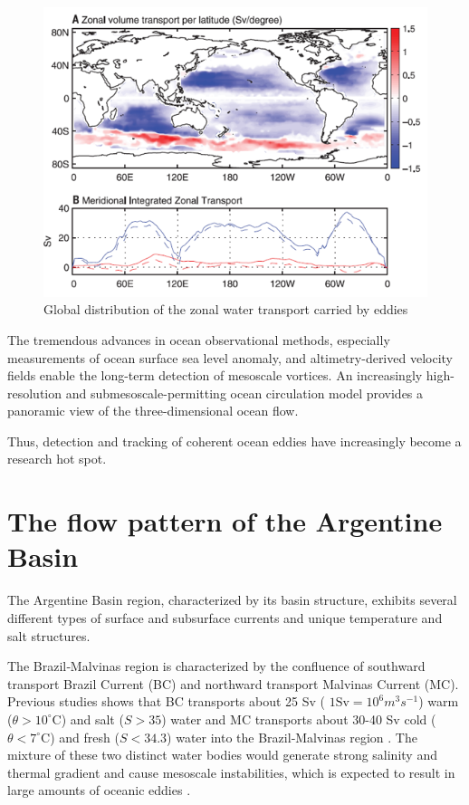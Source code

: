 \begin{figure}[ht]
  \centering
  \includegraphics[width=15cm]{chapter/figure/Global distribution of the zonal and meridional transport of fluid trapped by mesoscale eddies.png}
  \caption
  {Global distribution of the zonal water transport carried by eddies 
  \cite{zhang2014oceanic} }
  \label{zonal transport of fluid carried by mesoscale eddies}
\end{figure}

The tremendous advances in ocean observational methods, especially measurements of ocean surface sea level anomaly, and altimetry-derived velocity fields enable the long-term detection of mesoscale vortices. An increasingly high-resolution and submesoscale-permitting ocean circulation model provides a panoramic view of the three-dimensional ocean flow.

Thus, detection and tracking of coherent ocean eddies have increasingly become a research hot spot.  

\section{The flow pattern of the Argentine Basin}\label{flow pattern of the Argentine Basin}

The Argentine Basin region, characterized by its basin structure, exhibits several different types of surface and subsurface currents and unique temperature and salt structures.

The Brazil‐Malvinas region is characterized by the confluence of southward transport Brazil Current (BC) and northward transport Malvinas Current (MC). Previous studies shows that BC transports about 25 Sv ( $ 1 \mathrm{Sv} = 10^6 m^3 s^{-1}$) warm ($\theta > 10^{\circ} \mathrm{C}$) and salt ($S > 35$) water and MC transports about 30-40 Sv cold ($\theta < 7^{\circ} \mathrm{C}$) and fresh ($S < 34.3$) water into the  Brazil‐Malvinas region \cite{jullion2010circulation}. The mixture of these two distinct water bodies would 
generate strong salinity and thermal gradient and cause mesoscale instabilities, which is expected to result in large amounts of oceanic eddies \cite{de2006multi}.


